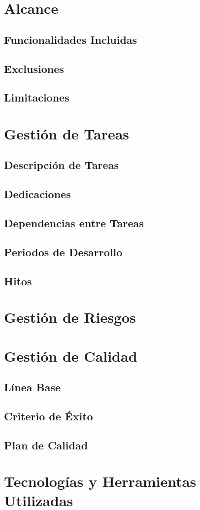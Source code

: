 \section{Alcance}
\subsection{Funcionalidades Incluidas}
\subsection{Exclusiones}
\subsection{Limitaciones}

\section{Gestión de Tareas}
\subsection{Descripción de Tareas}
\subsection{Dedicaciones}
\subsection{Dependencias entre Tareas}
\subsection{Periodos de Desarrollo}
\subsection{Hitos}

\section{Gestión de Riesgos}

\section{Gestión de Calidad}
\subsection{Línea Base}
\subsection{Criterio de Éxito}
\subsection{Plan de Calidad}

\section{Tecnologías y Herramientas Utilizadas}
